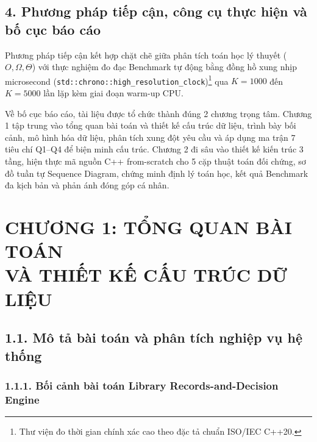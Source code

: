\documentclass[14pt,a4paper]{extarticle}
\begin{document}
\subsection*{4. Phương pháp tiếp cận, công cụ thực hiện và bố cục báo cáo}

Phương pháp tiếp cận kết hợp chặt chẽ giữa phân tích toán học lý thuyết ($O, \Omega, \Theta$) với thực nghiệm đo đạc Benchmark tự động bằng đồng hồ xung nhịp microsecond (\texttt{std::chrono::high\_resolution\_clock})\footnote{Thư viện đo thời gian chính xác cao theo đặc tả chuẩn ISO/IEC C++20.} qua $K=1000$ đến $K=5000$ lần lặp kèm giai đoạn warm-up CPU.

Về bố cục báo cáo, tài liệu được tổ chức thành đúng 2 chương trọng tâm. Chương 1 tập trung vào tổng quan bài toán và thiết kế cấu trúc dữ liệu, trình bày bối cảnh, mô hình hóa dữ liệu, phân tích xung đột yêu cầu và áp dụng ma trận 7 tiêu chí Q1--Q4 để biện minh cấu trúc. Chương 2 đi sâu vào thiết kế kiến trúc 3 tầng, hiện thực mã nguồn C++ from-scratch cho 5 cặp thuật toán đối chứng, sơ đồ tuần tự Sequence Diagram, chứng minh định lý toán học, kết quả Benchmark đa kịch bản và phản ánh đóng góp cá nhân.

\newpage
\section*{CHƯƠNG 1: TỔNG QUAN BÀI TOÁN\\VÀ THIẾT KẾ CẤU TRÚC DỮ LIỆU}

\subsection*{1.1. Mô tả bài toán và phân tích nghiệp vụ hệ thống}

\subsubsection*{1.1.1. Bối cảnh bài toán Library Records-and-Decision Engine}
\end{document}
